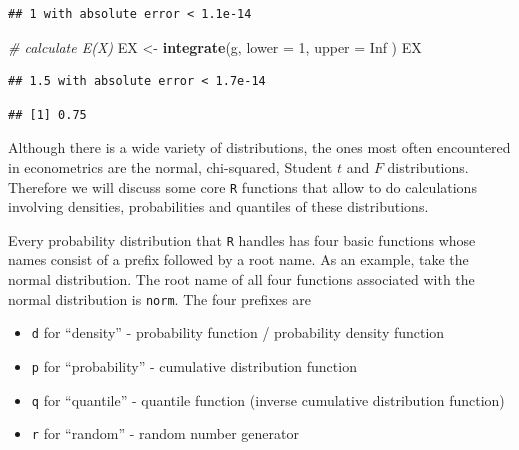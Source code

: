 \documentclass[]{book}
\newenvironment{Shaded}{\begin{snugshade}}{\end{snugshade}}
\newcommand{\KeywordTok}[1]{\textcolor[rgb]{0.13,0.29,0.53}{\textbf{#1}}}
\newcommand{\DataTypeTok}[1]{\textcolor[rgb]{0.13,0.29,0.53}{#1}}
\newcommand{\DecValTok}[1]{\textcolor[rgb]{0.00,0.00,0.81}{#1}}
\newcommand{\StringTok}[1]{\textcolor[rgb]{0.31,0.60,0.02}{#1}}
\newcommand{\CommentTok}[1]{\textcolor[rgb]{0.56,0.35,0.01}{\textit{#1}}}
\newcommand{\OtherTok}[1]{\textcolor[rgb]{0.56,0.35,0.01}{#1}}
\newcommand{\OperatorTok}[1]{\textcolor[rgb]{0.81,0.36,0.00}{\textbf{#1}}}
\newcommand{\NormalTok}[1]{#1}
\providecommand{\tightlist}{%
  \setlength{\itemsep}{0pt}\setlength{\parskip}{0pt}}
\theoremstyle{definition}
\theoremstyle{definition}
\theoremstyle{definition}
\theoremstyle{remark}
\begin{document}
\begin{verbatim}
## 1 with absolute error < 1.1e-14
\end{verbatim}

\begin{Shaded}
\begin{Highlighting}[]
\CommentTok{# calculate E(X)}
\NormalTok{EX <-}\StringTok{ }\KeywordTok{integrate}\NormalTok{(g,}
                \DataTypeTok{lower =} \DecValTok{1}\NormalTok{,}
                \DataTypeTok{upper =} \OtherTok{Inf}
\NormalTok{                )}
\NormalTok{EX}
\end{Highlighting}
\end{Shaded}

\begin{verbatim}
## 1.5 with absolute error < 1.7e-14
\end{verbatim}

\begin{Shaded}
\end{Shaded}

\begin{verbatim}
## [1] 0.75
\end{verbatim}

Although there is a wide variety of distributions, the ones most often
encountered in econometrics are the normal, chi-squared, Student \(t\)
and \(F\) distributions. Therefore we will discuss some core \texttt{R}
functions that allow to do calculations involving densities,
probabilities and quantiles of these distributions.

Every probability distribution that \texttt{R} handles has four basic
functions whose names consist of a prefix followed by a root name. As an
example, take the normal distribution. The root name of all four
functions associated with the normal distribution is \texttt{norm}. The
four prefixes are

\begin{itemize}
\tightlist
\item
  \texttt{d} for ``density'' - probability function / probability
  density function
\item
  \texttt{p} for ``probability'' - cumulative distribution function
\item
  \texttt{q} for ``quantile'' - quantile function (inverse cumulative
  distribution function)
\item
  \texttt{r} for ``random'' - random number generator
\end{itemize}
\end{document}
